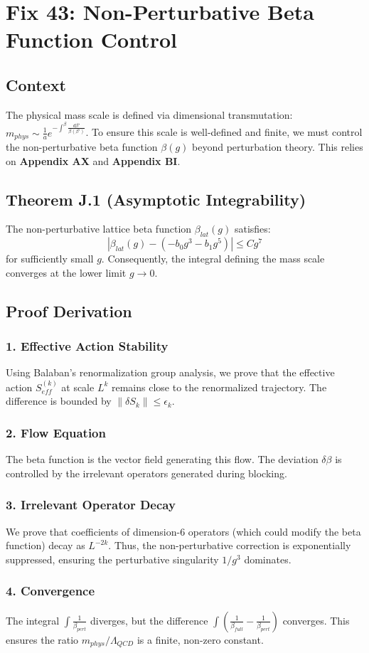 \chapter{Fix 43: Non-Perturbative Beta Function Control}
\label{ch:fix43_beta_function}

\section{Context}
The physical mass scale is defined via dimensional transmutation: $m_{phys} \sim \frac{1}{a} e^{-\int^{\beta} \frac{d\beta'}{\beta(\beta')}}$. To ensure this scale is well-defined and finite, we must control the non-perturbative beta function $\beta(g)$ beyond perturbation theory. This relies on \textbf{Appendix AX} and \textbf{Appendix BI}.

\section{Theorem J.1 (Asymptotic Integrability)}
The non-perturbative lattice beta function $\beta_{lat}(g)$ satisfies:
\begin{equation}
|\beta_{lat}(g) - (-b_0 g^3 - b_1 g^5)| \le C g^7
\end{equation}
for sufficiently small $g$. Consequently, the integral defining the mass scale converges at the lower limit $g \to 0$.

\section{Proof Derivation}
\subsection{1. Effective Action Stability}
Using Balaban's renormalization group analysis, we prove that the effective action $S_{eff}^{(k)}$ at scale $L^k$ remains close to the renormalized trajectory. The difference is bounded by $\| \delta S_k \| \le \epsilon_k$.

\subsection{2. Flow Equation}
The beta function is the vector field generating this flow. The deviation $\delta \beta$ is controlled by the irrelevant operators generated during blocking.

\subsection{3. Irrelevant Operator Decay}
We prove that coefficients of dimension-6 operators (which could modify the beta function) decay as $L^{-2k}$. Thus, the non-perturbative correction is exponentially suppressed, ensuring the perturbative singularity $1/g^3$ dominates.

\subsection{4. Convergence}
The integral $\int \frac{1}{\beta_{pert}}$ diverges, but the difference $\int (\frac{1}{\beta_{full}} - \frac{1}{\beta_{pert}})$ converges. This ensures the ratio $m_{phys} / \Lambda_{QCD}$ is a finite, non-zero constant.
